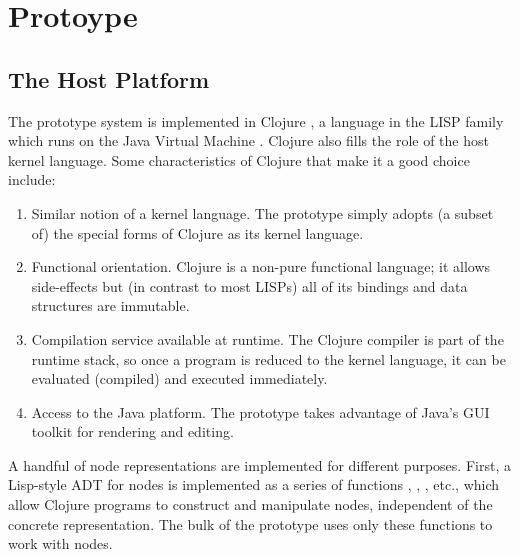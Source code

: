\section{Protoype}

\subsection{The Host Platform}
The prototype system is implemented in Clojure \cite{hickey}, a language in the LISP family which runs on the Java Virtual Machine \cite{gosling}. Clojure also fills the role of the host kernel language. Some characteristics of Clojure that make it a good choice include:
\begin{enumerate}
\item Similar notion of a kernel language. The prototype simply adopts (a subset of) the special forms of Clojure as its kernel language.
\item Functional orientation. Clojure is a non-pure functional language; it allows side-effects but (in contrast to most LISPs) all of its bindings and data structures are immutable. %
\item Compilation service available at runtime. The Clojure compiler is part of the runtime stack, so once a program is reduced to the kernel language, it can be evaluated (compiled) and executed immediately.
\item Access to the Java platform. The prototype takes advantage of Java's GUI toolkit for rendering and editing.
\end{enumerate}

A handful of node representations are implemented for different purposes. First, a Lisp-style ADT for nodes is implemented as a series of functions , , , etc., which allow Clojure programs to construct and manipulate nodes, independent of the concrete representation. The bulk of the prototype uses only these functions to work with nodes.

